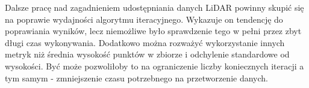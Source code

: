 Dalsze pracę nad zagadnieniem udostępniania danych LiDAR powinny skupić się na poprawie
wydajności algorytmu iteracyjnego. Wykazuje on tendencję do poprawiania wyników, lecz
niemożliwe było sprawdzenie tego w pełni przez zbyt długi czas wykonywania. Dodatkowo
można rozważyć wykorzystanie innych metryk niż średnia wysokość punktów w zbiorze
i odchylenie standardowe od wysokości. Być może pozwoliłoby to na ograniczenie liczby
koniecznych iteracji a tym samym - zmniejszenie czasu potrzebnego na przetworzenie danych.
